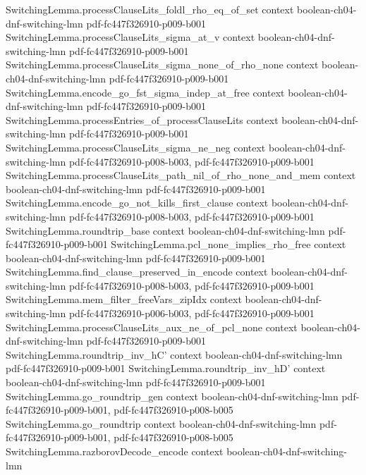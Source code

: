 \begin{theorem}
  {SwitchingLemma.processClauseLits_foldl_rho_eq_of_set}
  {context}
  {boolean-ch04-dnf-switching-lmn}
  {pdf-fc447f326910-p009-b001}
\proofstep
  {SwitchingLemma.processClauseLits_sigma_at_v}
  {context}
  {boolean-ch04-dnf-switching-lmn}
  {pdf-fc447f326910-p009-b001}
\proofstep
  {SwitchingLemma.processClauseLits_sigma_none_of_rho_none}
  {context}
  {boolean-ch04-dnf-switching-lmn}
  {pdf-fc447f326910-p009-b001}
\proofstep
  {SwitchingLemma.encode_go_fst_sigma_indep_at_free}
  {context}
  {boolean-ch04-dnf-switching-lmn}
  {pdf-fc447f326910-p009-b001}
\proofstep
  {SwitchingLemma.processEntries_of_processClauseLits}
  {context}
  {boolean-ch04-dnf-switching-lmn}
  {pdf-fc447f326910-p009-b001}
\proofstep
  {SwitchingLemma.processClauseLits_sigma_ne_neg}
  {context}
  {boolean-ch04-dnf-switching-lmn}
  {pdf-fc447f326910-p008-b003,
    pdf-fc447f326910-p009-b001}
\proofstep
  {SwitchingLemma.processClauseLits_path_nil_of_rho_none_and_mem}
  {context}
  {boolean-ch04-dnf-switching-lmn}
  {pdf-fc447f326910-p009-b001}
\proofstep
  {SwitchingLemma.encode_go_not_kills_first_clause}
  {context}
  {boolean-ch04-dnf-switching-lmn}
  {pdf-fc447f326910-p008-b003,
    pdf-fc447f326910-p009-b001}
\proofstep
  {SwitchingLemma.roundtrip_base}
  {context}
  {boolean-ch04-dnf-switching-lmn}
  {pdf-fc447f326910-p009-b001}
\proofstep
  {SwitchingLemma.pcl_none_implies_rho_free}
  {context}
  {boolean-ch04-dnf-switching-lmn}
  {pdf-fc447f326910-p009-b001}
\proofstep
  {SwitchingLemma.find_clause_preserved_in_encode}
  {context}
  {boolean-ch04-dnf-switching-lmn}
  {pdf-fc447f326910-p008-b003,
    pdf-fc447f326910-p009-b001}
\proofstep
  {SwitchingLemma.mem_filter_freeVars_zipIdx}
  {context}
  {boolean-ch04-dnf-switching-lmn}
  {pdf-fc447f326910-p006-b003,
    pdf-fc447f326910-p009-b001}
\proofstep
  {SwitchingLemma.processClauseLits_aux_ne_of_pcl_none}
  {context}
  {boolean-ch04-dnf-switching-lmn}
  {pdf-fc447f326910-p009-b001}
\proofstep
  {SwitchingLemma.roundtrip_inv_hC'}
  {context}
  {boolean-ch04-dnf-switching-lmn}
  {pdf-fc447f326910-p009-b001}
\proofstep
  {SwitchingLemma.roundtrip_inv_hD'}
  {context}
  {boolean-ch04-dnf-switching-lmn}
  {pdf-fc447f326910-p009-b001}
\proofstep
  {SwitchingLemma.go_roundtrip_gen}
  {context}
  {boolean-ch04-dnf-switching-lmn}
  {pdf-fc447f326910-p009-b001,
    pdf-fc447f326910-p008-b005}
\proofstep
  {SwitchingLemma.go_roundtrip}
  {context}
  {boolean-ch04-dnf-switching-lmn}
  {pdf-fc447f326910-p009-b001,
    pdf-fc447f326910-p008-b005}
\proofstep
  {SwitchingLemma.razborovDecode_encode}
  {context}
  {boolean-ch04-dnf-switching-lmn}

\end{theorem}
